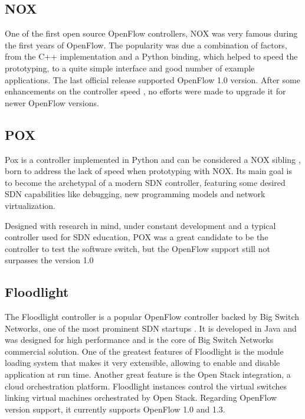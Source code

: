     \subsection{NOX}

    One of the first open source OpenFlow controllers, NOX \cite{nox} was very famous during the first years of OpenFlow. The popularity was due a combination of factors, from the C++ implementation and a Python binding, which helped to speed the prototyping, to a quite simple interface and good number of example applications. The last official release supported OpenFlow 1.0 version. After some enhancements on the controller speed \cite{nox-mt}, no efforts were made to upgrade it for newer OpenFlow versions. 
    
    \subsection{POX}
    
    Pox is a controller implemented in Python and can be considered a NOX sibling \cite{pox}, born to address the lack of speed when prototyping with NOX. Its main goal is to become the archetypal of a modern SDN controller, featuring some desired SDN capabilities like debugging, new programming models and network virtualization. 
    
    Designed with research in mind, under constant development and a typical controller used for SDN education, POX was a great candidate to be the controller to test the software switch, but the OpenFlow support still not surpasses the version 1.0
  
    \subsection{Floodlight}

    The Floodlight controller is a popular OpenFlow controller backed by Big Switch Networks, one of the most prominent SDN startups \cite{floodlight}. It is developed in Java and was designed for high performance and is the core of Big Switch Networks commercial solution. One of the greatest features of Floodlight is the module loading system that makes it very extensible, allowing to enable and disable application at run time. Another great feature is the Open Stack integration, a cloud orchestration platform. Floodlight instances control the virtual switches linking virtual machines orchestrated by Open Stack. Regarding OpenFlow version support, it currently supports OpenFlow 1.0 and 1.3. 
  
